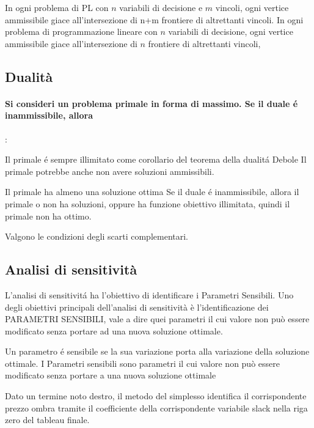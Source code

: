 \documentclass[12pt, a4paper, openany]{book}
\begin{document}
\affermazionefalse
{In ogni problema di PL con $n$ variabili di decisione e $m$ vincoli, ogni vertice ammissibile giace all'intersezione di n+m frontiere di altrettanti vincoli.}
{In ogni problema di programmazione lineare con $n$
variabili di decisione, ogni vertice ammissibile giace
all'intersezione di $n$ frontiere di altrettanti vincoli, }


\subsection{Dualità}

\paragraph{Si consideri un problema primale in forma di massimo. Se il duale é inammissibile, allora}:

\affermazionefalse
{Il primale é sempre illimitato come corollario del teorema della dualitá Debole}
{Il primale potrebbe anche non avere soluzioni ammissibili.}

\affermazionefalse
{Il primale ha almeno una soluzione ottima}
{Se il duale é inammissibile, allora il primale o non ha soluzioni, oppure ha funzione obiettivo illimitata, quindi il primale non ha ottimo.}

\affermazione
{Valgono le condizioni degli scarti complementari.}

\subsection{Analisi di sensitività}

\affermazionetrue
{L'analisi di sensitivitá ha l'obiettivo di identificare i Parametri Sensibili.}
{Uno degli obiettivi principali dell'analisi di sensitività è l'identificazione dei PARAMETRI SENSIBILI, vale
a dire quei parametri il cui valore non può essere modificato senza portare ad una nuova soluzione
ottimale.}

\affermazionetrue
{Un parametro é sensibile se la sua variazione porta alla variazione della soluzione ottimale.}
{I Parametri sensibili sono parametri il cui valore non può essere modificato senza portare a una nuova soluzione ottimale}

\affermazionetrue
{Dato un termine noto destro, il metodo del simplesso identifica il corrispondente prezzo ombra tramite il coefficiente
della corrispondente variabile slack nella riga zero del tableau finale.}
{}
\end{document}
